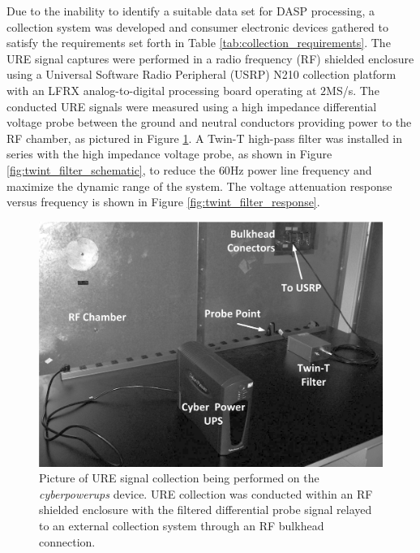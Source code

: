 Due to the inability to identify a suitable data set for DASP processing, a collection system was developed and consumer electronic devices gathered to satisfy the requirements set forth in Table \ref{tab:collection_requirements}.  The URE signal captures were performed in a radio frequency (RF) shielded enclosure using a Universal Software Radio Peripheral (USRP) N210 collection platform with an LFRX analog-to-digital processing board operating at $2$MS/s.  The conducted URE signals were measured using a high impedance differential voltage probe between the ground and neutral conductors providing power to the RF chamber, as pictured in Figure \ref{fig:chamber_pic}.  A Twin-T high-pass filter \cite{Cooke2016} was installed in series with the high impedance voltage probe, as shown in Figure \ref{fig:twint_filter_schematic}, to reduce the $60$Hz power line frequency and maximize the dynamic range of the system.  The voltage attenuation response versus frequency is shown in Figure \ref{fig:twint_filter_response}.

\begin{figure}[tb]
	\includegraphics[width=\textwidth]{./data_collection_results/chamberAdj.jpg}
	\centering
	\caption{Picture of URE signal collection being performed on the \textit{cyberpowerups} device.  URE collection was conducted within an RF shielded enclosure with the filtered differential probe signal relayed to an external collection system through an RF bulkhead connection.}
	\label{fig:chamber_pic}
\end{figure}

